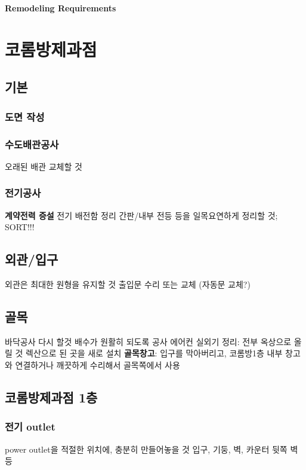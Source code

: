 \documentclass{myproc}
\begin{document}
\begin{center}
  \textcolor{blue2}{\large\bf Remodeling Requirements}
  \\
  \vspace*{0.8cm}

\end{center}

\small

\section{코롬방제과점}
\subsection{기본}
\subsubsection{도면 작성}

\subsubsection{수도배관공사}
\bit
\w 오래된 배관 교체할 것
\eit

\subsubsection{전기공사}
\bit
\w \textcolor{red2}{\bf{}계약전력 증설}
\w 전기 배전함 정리
\w 간판/내부 전등 등을 일목요연하게 정리할 것; SORT!!!
\eit

\subsection{외관/입구}
\bit
\w 외관은 최대한 원형을 유지할 것
\w 출입문 수리 또는 교체 (자동문 교체?)
\eit

\subsection{골목}
\bit
\w 바닥공사 다시 할것
\w 배수가 원활히 되도록 공사
\w 에어컨 실외기 정리: 전부 옥상으로 올릴 것
\w 렉산으로 된 곳을 새로 설치
\w \textcolor{red2}{\bf{}골목창고}: 입구를 막아버리고, 코롬방1층 내부 창고와
연결하거나 깨끗하게 수리해서 골목쪽에서 사용
\eit


\subsection{코롬방제과점 1층}
\subsubsection{전기 outlet}
\bit
\w \textcolor{red2}{power outlet을 적절한 위치에, 충분히 만들어놓을 것}
\w 입구, 기둥, 벽, 카운터 뒷쪽 벽 등 
\eit
\end{document}
